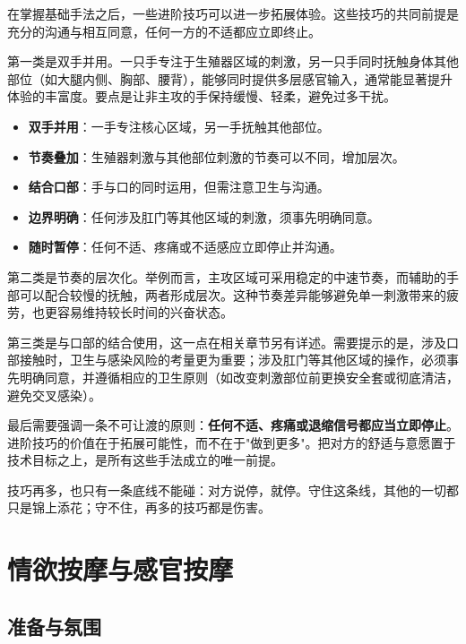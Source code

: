 \documentclass[12pt,UTF8]{ctexbook}
\newcommand{\keyword}[1]{\textbf{#1}}
\begin{document}
在掌握基础手法之后，一些进阶技巧可以进一步拓展体验。这些技巧的共同前提是充分的沟通与相互同意，任何一方的不适都应立即终止。

第一类是双手并用。一只手专注于生殖器区域的刺激，另一只手同时抚触身体其他部位（如大腿内侧、胸部、腰背），能够同时提供多层感官输入，通常能显著提升体验的丰富度。要点是让非主攻的手保持缓慢、轻柔，避免过多干扰。

\begin{itemize}
  \item \keyword{双手并用}：一手专注核心区域，另一手抚触其他部位。
  \item \keyword{节奏叠加}：生殖器刺激与其他部位刺激的节奏可以不同，增加层次。
  \item \keyword{结合口部}：手与口的同时运用，但需注意卫生与沟通。
  \item \keyword{边界明确}：任何涉及肛门等其他区域的刺激，须事先明确同意。
  \item \keyword{随时暂停}：任何不适、疼痛或不适感应立即停止并沟通。
\end{itemize}

第二类是节奏的层次化。举例而言，主攻区域可采用稳定的中速节奏，而辅助的手部可以配合较慢的抚触，两者形成层次。这种节奏差异能够避免单一刺激带来的疲劳，也更容易维持较长时间的兴奋状态。

第三类是与口部的结合使用，这一点在相关章节另有详述。需要提示的是，涉及口部接触时，卫生与感染风险的考量更为重要；涉及肛门等其他区域的操作，必须事先明确同意，并遵循相应的卫生原则（如改变刺激部位前更换安全套或彻底清洁，避免交叉感染）。

最后需要强调一条不可让渡的原则：\keyword{任何不适、疼痛或退缩信号都应当立即停止}。进阶技巧的价值在于拓展可能性，而不在于"做到更多"。把对方的舒适与意愿置于技术目标之上，是所有这些手法成立的唯一前提。

\begin{tcolorbox}[colback=pink!5!white,colframe=red!50!black,title=贴心小叮咛]
技巧再多，也只有一条底线不能碰：对方说停，就停。守住这条线，其他的一切都只是锦上添花；守不住，再多的技巧都是伤害。
\end{tcolorbox}

\section{情欲按摩与感官按摩}
\subsection{准备与氛围}
\end{document}
